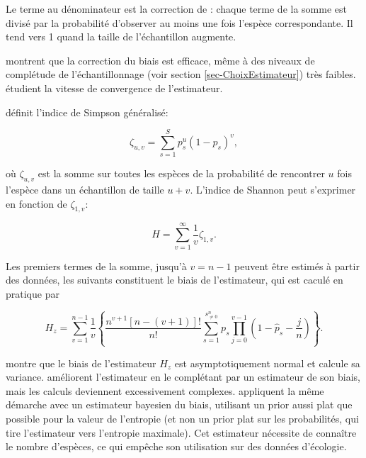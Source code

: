 \documentclass[
  11pt,
  french,
  a4paper,
  extrafontsizes,onecolumn,openright
  ]{memoir}
\begin{document}
Le terme au dénominateur est la correction de \textcite{Horvitz1952}: chaque terme de la somme est divisé par la probabilité d'observer au moins une fois l'espèce correspondante.
Il tend vers 1 quand la taille de l'échantillon augmente.

\textcite{Beck2010} montrent que la correction du biais est efficace, même à des niveaux de complétude de l'échantillonnage (voir section \ref{sec-ChoixEstimateur}) très faibles. \textcite{Vu2007} étudient la vitesse de convergence de l'estimateur.

\textcite{Zhang2012} définit l'indice de Simpson généralisé:

\begin{equation}
  \label{eq:zeta}
  \zeta_{u,v} = \sum^S_{s=1}{p^u_s{\left(1-p_s\right)}^v},
\end{equation}

où \(\zeta_{u,v}\) est la somme sur toutes les espèces de la probabilité de rencontrer \(u\) fois l'espèce dans un échantillon de taille \(u+v\).
L'indice de Shannon peut s'exprimer en fonction de \(\zeta_{1,v}\):

\begin{equation}
  \label{eq:HzetaInf}
  H = \sum^{\infty}_{v=1}{\frac{1}{v} \zeta_{1,v}}.
\end{equation}

Les premiers termes de la somme, jusqu'à \(v=n-1\) peuvent être estimés à partir des données, les suivants constituent le biais de l'estimateur, qui est caculé en pratique par

\begin{equation}
  \label{eq:Hzetanu}
  H_z = \sum^{n-1}_{v=1}{\frac{1}{v}\left\{\frac{n^{v+1}\left[n-\left(v+1\right)\right]!}{n!}\sum^{s^{n}_{\ne 0}}_{s=1}{p_s\prod^{v-1}_{j=0}{\left(1-{\hat{p}}_s-\frac{j}{n}\right)}}\right\}}.
\end{equation}

\textcite{Zhang2013a} montre que le biais de l'estimateur \(H_z\) est asymptotiquement normal et calcule sa variance.
\textcite{Zhang2013} améliorent l'estimateur en le complétant par un estimateur de son biais, mais les calculs deviennent excessivement complexes.
\textcite{Vinck2012} appliquent la même démarche avec un estimateur bayesien du biais, utilisant un prior aussi plat que possible pour la valeur de l'entropie (et non un prior plat sur les probabilités, qui tire l'estimateur vers l'entropie maximale).
Cet estimateur nécessite de connaître le nombre d'espèces, ce qui empêche son utilisation sur des données d'écologie.
\end{document}
